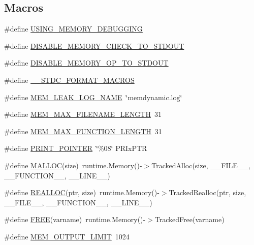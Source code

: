 \subsection*{Macros}
\begin{DoxyCompactItemize}
\item 
\#define \hyperlink{_allocator_8h_a57045b12fc465df47e223a6aa98f95f3}{U\-S\-I\-N\-G\-\_\-\-M\-E\-M\-O\-R\-Y\-\_\-\-D\-E\-B\-U\-G\-G\-I\-N\-G}
\item 
\#define \hyperlink{_allocator_8h_ab332d550e31ec677168b046e54f5d775}{D\-I\-S\-A\-B\-L\-E\-\_\-\-M\-E\-M\-O\-R\-Y\-\_\-\-C\-H\-E\-C\-K\-\_\-\-T\-O\-\_\-\-S\-T\-D\-O\-U\-T}
\item 
\#define \hyperlink{_allocator_8h_aa80cc71650d16e47bb40fa850083efc0}{D\-I\-S\-A\-B\-L\-E\-\_\-\-M\-E\-M\-O\-R\-Y\-\_\-\-O\-P\-\_\-\-T\-O\-\_\-\-S\-T\-D\-O\-U\-T}
\item 
\#define \hyperlink{_allocator_8h_aacbb9e1f38be71e22df1584a37c56693}{\-\_\-\-\_\-\-S\-T\-D\-C\-\_\-\-F\-O\-R\-M\-A\-T\-\_\-\-M\-A\-C\-R\-O\-S}
\item 
\#define \hyperlink{_allocator_8h_a4f16e38be32a4bbda23c530b11e19fb8}{M\-E\-M\-\_\-\-L\-E\-A\-K\-\_\-\-L\-O\-G\-\_\-\-N\-A\-M\-E}~\char`\"{}memdynamic.\-log\char`\"{}
\item 
\#define \hyperlink{_allocator_8h_ac811ed79333c5131bf74f609b0b67fcf}{M\-E\-M\-\_\-\-M\-A\-X\-\_\-\-F\-I\-L\-E\-N\-A\-M\-E\-\_\-\-L\-E\-N\-G\-T\-H}~31
\item 
\#define \hyperlink{_allocator_8h_af15f994b428f827c19ae31d1df47d7ca}{M\-E\-M\-\_\-\-M\-A\-X\-\_\-\-F\-U\-N\-C\-T\-I\-O\-N\-\_\-\-L\-E\-N\-G\-T\-H}~31
\item 
\#define \hyperlink{_allocator_8h_a8aa19886dfd5381ab173d9fcfec3e01d}{P\-R\-I\-N\-T\-\_\-\-P\-O\-I\-N\-T\-E\-R}~\char`\"{}\%08\char`\"{} P\-R\-Ix\-P\-T\-R
\item 
\#define \hyperlink{_allocator_8h_a3078f3c259e2a871314e3e0194896357}{M\-A\-L\-L\-O\-C}(size)~runtime.\-Memory()-\/$>$Tracked\-Alloc(size, \-\_\-\-\_\-\-F\-I\-L\-E\-\_\-\-\_\-, \-\_\-\-\_\-\-F\-U\-N\-C\-T\-I\-O\-N\-\_\-\-\_\-, \-\_\-\-\_\-\-L\-I\-N\-E\-\_\-\-\_\-)
\item 
\#define \hyperlink{_allocator_8h_a718b6446905826d711cb7ef00808bb4e}{R\-E\-A\-L\-L\-O\-C}(ptr, size)~runtime.\-Memory()-\/$>$Tracked\-Realloc(ptr, size, \-\_\-\-\_\-\-F\-I\-L\-E\-\_\-\-\_\-, \-\_\-\-\_\-\-F\-U\-N\-C\-T\-I\-O\-N\-\_\-\-\_\-, \-\_\-\-\_\-\-L\-I\-N\-E\-\_\-\-\_\-)
\item 
\#define \hyperlink{_allocator_8h_a89e21687efe425e8f99a4d0aac6f537c}{F\-R\-E\-E}(varname)~runtime.\-Memory()-\/$>$Tracked\-Free(varname)
\item 
\#define \hyperlink{_allocator_8h_aa041ffb2d12d9cd00022df58acb31c92}{M\-E\-M\-\_\-\-O\-U\-T\-P\-U\-T\-\_\-\-L\-I\-M\-I\-T}~1024
\end{DoxyCompactItemize}
